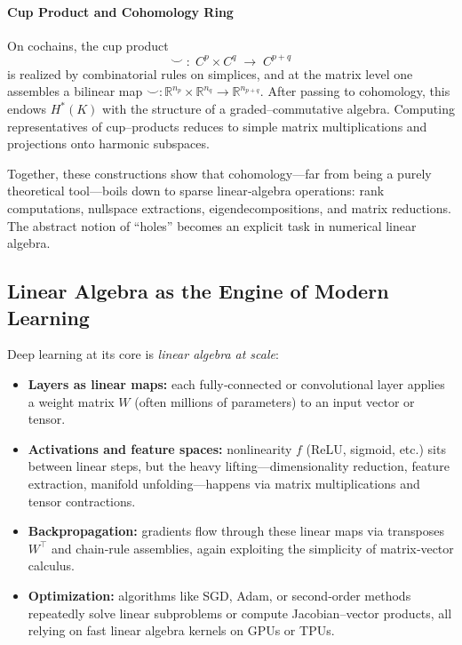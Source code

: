 \paragraph{Cup Product and Cohomology Ring}  
On cochains, the cup product
\[
\smile \;:\; C^p\times C^q \;\longrightarrow\; C^{p+q}
\]
is realized by combinatorial rules on simplices, and at the matrix level one assembles a bilinear map
\(\smile: \mathbb R^{n_p}\times\mathbb R^{n_q}\to\mathbb R^{n_{p+q}}\).  
After passing to cohomology, this endows \(H^*(K)\) with the structure of a graded–commutative algebra.  Computing representatives of cup–products reduces to simple matrix multiplications and projections onto harmonic subspaces.

\medskip  
Together, these constructions show that cohomology—far from being a purely theoretical tool—boils down to sparse linear‐algebra operations: rank computations, nullspace extractions, eigendecompositions, and matrix reductions.  The abstract notion of “holes” becomes an explicit task in numerical linear algebra.  



























\subsection{Linear Algebra as the Engine of Modern Learning}
Deep learning at its core is \emph{linear algebra at scale}:
\begin{itemize}
  \item \textbf{Layers as linear maps:} each fully‐connected or convolutional layer applies a weight matrix \(W\) (often millions of parameters) to an input vector or tensor.
  \item \textbf{Activations and feature spaces:} nonlinearity \(f\) (ReLU, sigmoid, etc.) sits between linear steps, but the heavy lifting—dimensionality reduction, feature extraction, manifold unfolding—happens via matrix multiplications and tensor contractions.
  \item \textbf{Backpropagation:} gradients flow through these linear maps via transposes \(W^\top\) and chain‐rule assemblies, again exploiting the simplicity of matrix‐vector calculus.
  \item \textbf{Optimization:} algorithms like SGD, Adam, or second‐order methods repeatedly solve linear subproblems or compute Jacobian–vector products, all relying on fast linear algebra kernels on GPUs or TPUs.
\end{itemize}

